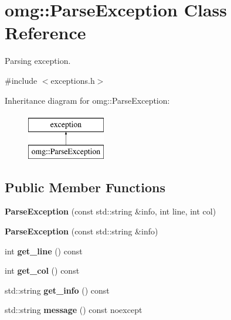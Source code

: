 \hypertarget{classomg_1_1_parse_exception}{}\section{omg\+::Parse\+Exception Class Reference}
\label{classomg_1_1_parse_exception}


Parsing exception.  




{\ttfamily \#include $<$exceptions.\+h$>$}

Inheritance diagram for omg\+::Parse\+Exception\+:\begin{figure}[H]
\begin{center}
\leavevmode
\includegraphics[height=2.000000cm]{classomg_1_1_parse_exception}
\end{center}
\end{figure}
\subsection*{Public Member Functions}
\begin{DoxyCompactItemize}
\item 
\mbox{\label{classomg_1_1_parse_exception_a0b6d3ac76bc5b1668ef932bfd78ed596}} 
{\bfseries Parse\+Exception} (const std\+::string \&info, int line, int col)
\item 
\mbox{\label{classomg_1_1_parse_exception_a37d794a188de0c719bd4807497572e5a}} 
{\bfseries Parse\+Exception} (const std\+::string \&info)
\item 
\mbox{\label{classomg_1_1_parse_exception_aefa41bed0af226db632d5853f1631024}} 
int {\bfseries get\+\_\+line} () const
\item 
\mbox{\label{classomg_1_1_parse_exception_a76483a693ddf73a4db2cc811ce993826}} 
int {\bfseries get\+\_\+col} () const
\item 
\mbox{\label{classomg_1_1_parse_exception_a7b926aa64f30abee94ab29b77c43b71c}} 
std\+::string {\bfseries get\+\_\+info} () const
\item 
\mbox{\label{classomg_1_1_parse_exception_a88cad34bc2f9172808fcfaaf4ef67659}} 
std\+::string {\bfseries message} () const noexcept
\end{DoxyCompactItemize}


